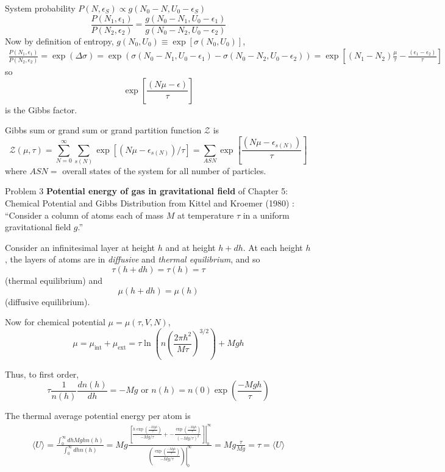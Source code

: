 \documentclass[10pt]{amsart}
\begin{document}
\begin{multicols*}{2}
System probability $P(N,\epsilon_S) \propto g(N_0- N,U_0-\epsilon_S)$
\[
\frac{ P(N_1,\epsilon_1) }{ P(N_2,\epsilon_2) } = \frac{ g(N_0-N_1, U_0-\epsilon_1)}{ g(N_0-N_2, U_0-\epsilon_2) }
\]
Now by definition of entropy, $g(N_0,U_0) \equiv \exp{ [\sigma(N_0,U_0)]}$,
\[
\begin{gathered}
  \frac{ P(N_1,\epsilon_1) }{ P(N_2,\epsilon_2) } = \exp{ (\Delta \sigma )} = \exp{ ( \sigma(N_0 -N_1, U_0 -\epsilon_1) - \sigma(N_0 -N_2, U_0 -\epsilon_2) ) }  = \exp{ \left[ (N_1-N_2) \frac{\mu}{\tau} - \frac{ (\epsilon_1-\epsilon_2)}{\tau} \right] }
\end{gathered}
\]
so 
\[
\exp{ \left[ \frac{(N\mu - \epsilon )}{\tau } \right] }
\]
is the Gibbs factor.  

Gibbs sum or grand sum or grand partition function $\mathcal{Z}$ is   
\[
\mathcal{Z}(\mu,\tau) = \sum_{N=0}^{\infty} \sum_{s(N)} \exp{ \left[ (N \mu - \epsilon_{s(N)} )/\tau \right] } = \sum_{ASN} \exp{ \left[ \frac{(N\mu - \epsilon_{s(N)} ) }{\tau} \right] }
\]
where $ASN = $ overall states of the system for all number of particles.  






Problem 3 \textbf{Potential energy of gas in gravitational field} of Chapter 5: Chemical Potential and Gibbs Distribution from Kittel and Kroemer (1980) \cite{CKittelHKroemer1980}: ``Consider a column of atoms each of mass $M$ at temperature $\tau$ in a uniform gravitational field $g$.''

Consider an infinitesimal layer at height $h$ and at height $h+dh$.  At each height $h$, the layers of atoms are in \emph{diffusive} and \emph{thermal equilibrium}, and so
\[
\tau(h+dh) = \tau(h) = \tau
\]
(thermal equilibrium) and 
\[
\mu(h+dh) = \mu(h)
\]
(diffusive equilibrium).  

Now for chemical potential $\mu = \mu(\tau,V,N)$,
\[
\mu = \mu_{\text{int}} + \mu_{\text{ext}} = \tau \ln{ \left( n \left( \frac{ 2\pi \hbar^2 }{M\tau} \right)^{3/2} \right) } + Mgh
\]

Thus, to first order,
\[
\tau \frac{1}{n(h) } \frac{ dn(h) }{dh} = -Mg \text{ or } n(h) = n(0) \exp{ \left( \frac{-Mgh}{\tau} \right) }
\]

The thermal average potential energy per atom is 
\[
\begin{gathered}
  \langle U \rangle = \frac{ \int_0^{\infty} dh Mgh n(h) }{ \int_0^{\infty} dh n(h) } = Mg \frac{ \left. \left[ \frac{ h \exp{ \left( \frac{-Mgh}{\tau} \right) } }{ -Mg/\tau } + - \frac{ \exp{ \left( \frac{-Mgh}{\tau} \right) } }{ (-Mg/\tau)^2 } \right] \right|_0^{\infty} }{ \left. \left( \frac{ \exp{ \left( \frac{-Mgh}{\tau } \right) } }{ -Mg/\tau} \right) \right|_0^{\infty} } = Mg \frac{\tau}{Mg} = \boxed{ \tau = \langle U \rangle }
\end{gathered}
\]


\end{multicols*}
\end{document}
